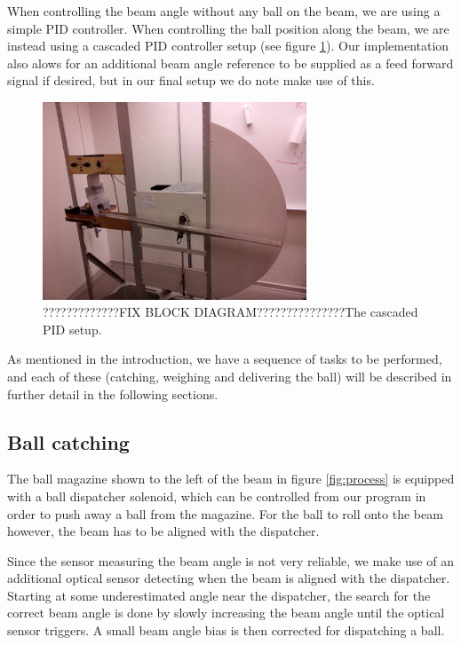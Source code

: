 When controlling the beam angle without any ball on the beam, we are using a simple PID controller.
When controlling the ball position along the beam, we are instead using a cascaded PID controller setup (see figure \ref{fig:cascaded_pid}).
Our implementation also alows for an additional beam angle reference to be supplied as a feed forward signal if desired, but in our final setup we do note make use of this.
\begin{figure}
\centering
\includegraphics[width=0.7\textwidth]{figures/process_fig.jpg}
\caption{?????????????FIX BLOCK DIAGRAM???????????????The cascaded PID setup.}\label{fig:cascaded_pid}
\end{figure}

As mentioned in the introduction, we have a sequence of tasks to be performed, and each of these (catching, weighing and delivering the ball) will be described in further detail in the following sections.

\subsection{Ball catching}\label{sec:ball_catching}
The ball magazine shown to the left of the beam in figure \ref{fig:process} is equipped with a ball dispatcher solenoid, which can be controlled from our program in order to push away a ball from the magazine.
For the ball to roll onto the beam however, the beam has to be aligned with the dispatcher.

Since the sensor measuring the beam angle is not very reliable, we make use of an additional optical sensor detecting when the beam is aligned with the dispatcher.
Starting at some underestimated angle near the dispatcher, the search for the correct beam angle is done by slowly increasing the beam angle until the optical sensor triggers. A small beam angle bias is then corrected for dispatching a ball.

